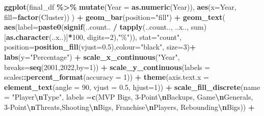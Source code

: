 \documentclass[
]{article}
\newenvironment{Shaded}{\begin{snugshade}}{\end{snugshade}}
\newcommand{\AttributeTok}[1]{\textcolor[rgb]{0.13,0.29,0.53}{#1}}
\newcommand{\DecValTok}[1]{\textcolor[rgb]{0.00,0.00,0.81}{#1}}
\newcommand{\FloatTok}[1]{\textcolor[rgb]{0.00,0.00,0.81}{#1}}
\newcommand{\FunctionTok}[1]{\textcolor[rgb]{0.13,0.29,0.53}{\textbf{#1}}}
\newcommand{\NormalTok}[1]{#1}
\newcommand{\SpecialCharTok}[1]{\textcolor[rgb]{0.81,0.36,0.00}{\textbf{#1}}}
\newcommand{\StringTok}[1]{\textcolor[rgb]{0.31,0.60,0.02}{#1}}
\begin{document}
\begin{Shaded}
\begin{Highlighting}[]
\FunctionTok{ggplot}\NormalTok{(final\_df }\SpecialCharTok{\%\textgreater{}\%} \FunctionTok{mutate}\NormalTok{(}\AttributeTok{Year =} \FunctionTok{as.numeric}\NormalTok{(Year)),}
       \FunctionTok{aes}\NormalTok{(}\AttributeTok{x=}\NormalTok{Year, }
           \AttributeTok{fill=}\FunctionTok{factor}\NormalTok{(Cluster))}
\NormalTok{       ) }\SpecialCharTok{+}
  \FunctionTok{geom\_bar}\NormalTok{(}\AttributeTok{position=}\StringTok{"fill"}\NormalTok{) }\SpecialCharTok{+}
  \FunctionTok{geom\_text}\NormalTok{(}
    \FunctionTok{aes}\NormalTok{(}\AttributeTok{label=}\FunctionTok{paste0}\NormalTok{(}\FunctionTok{signif}\NormalTok{(..count.. }\SpecialCharTok{/} \FunctionTok{tapply}\NormalTok{(..count.., ..x.., sum)[}\FunctionTok{as.character}\NormalTok{(..x..)]}\SpecialCharTok{*}\DecValTok{100}\NormalTok{, }\AttributeTok{digits=}\DecValTok{2}\NormalTok{),}\StringTok{"\%"}\NormalTok{)), }
    \AttributeTok{stat=}\StringTok{"count"}\NormalTok{,}
    \AttributeTok{position=}\FunctionTok{position\_fill}\NormalTok{(}\AttributeTok{vjust=}\FloatTok{0.5}\NormalTok{),}\AttributeTok{colour=}\StringTok{"black"}\NormalTok{, }\AttributeTok{size=}\DecValTok{3}\NormalTok{)}\SpecialCharTok{+}
  \FunctionTok{labs}\NormalTok{(}\AttributeTok{y=}\StringTok{"Percentage"}\NormalTok{) }\SpecialCharTok{+}
  \FunctionTok{scale\_x\_continuous}\NormalTok{(}\StringTok{"Year"}\NormalTok{, }\AttributeTok{breaks=}\FunctionTok{seq}\NormalTok{(}\DecValTok{2001}\NormalTok{,}\DecValTok{2022}\NormalTok{,}\AttributeTok{by=}\DecValTok{1}\NormalTok{)) }\SpecialCharTok{+}
  \FunctionTok{scale\_y\_continuous}\NormalTok{(}\AttributeTok{labels =}\NormalTok{ scales}\SpecialCharTok{::}\FunctionTok{percent\_format}\NormalTok{(}\AttributeTok{accuracy =} \DecValTok{1}\NormalTok{)) }\SpecialCharTok{+}
  \FunctionTok{theme}\NormalTok{(}\AttributeTok{axis.text.x =} \FunctionTok{element\_text}\NormalTok{(}\AttributeTok{angle =} \DecValTok{90}\NormalTok{, }\AttributeTok{vjust =} \FloatTok{0.5}\NormalTok{, }\AttributeTok{hjust=}\DecValTok{1}\NormalTok{)) }\SpecialCharTok{+}
  \FunctionTok{scale\_fill\_discrete}\NormalTok{(}\AttributeTok{name =} \StringTok{"Player}\SpecialCharTok{\textbackslash{}n}\StringTok{Type"}\NormalTok{, }\AttributeTok{labels =}\FunctionTok{c}\NormalTok{(}\StringTok{\textquotesingle{}MVP Bigs\textquotesingle{}}\NormalTok{, }\StringTok{\textquotesingle{}3{-}Point}\SpecialCharTok{\textbackslash{}n}\StringTok{Backups\textquotesingle{}}\NormalTok{, }\StringTok{\textquotesingle{}Game}\SpecialCharTok{\textbackslash{}n}\StringTok{Generals\textquotesingle{}}\NormalTok{, }\StringTok{\textquotesingle{}3{-}Point}\SpecialCharTok{\textbackslash{}n}\StringTok{Threats\textquotesingle{}}\NormalTok{,}\StringTok{\textquotesingle{}Shooting}\SpecialCharTok{\textbackslash{}n}\StringTok{Bigs\textquotesingle{}}\NormalTok{, }\StringTok{\textquotesingle{}Franchise}\SpecialCharTok{\textbackslash{}n}\StringTok{Players\textquotesingle{}}\NormalTok{, }\StringTok{\textquotesingle{}Rebounding}\SpecialCharTok{\textbackslash{}n}\StringTok{Bigs\textquotesingle{}}\NormalTok{)) }\SpecialCharTok{+}

\end{Highlighting}
\end{Shaded}
\end{document}
